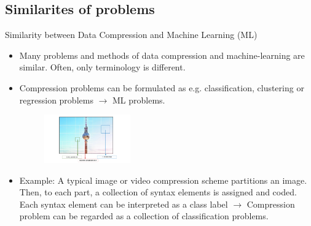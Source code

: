 \subsection{Similarites of problems}
\begin{frame}{Similarity between Data Compression and Machine Learning (ML)}
\begin{itemize}
\item Many problems and methods of data compression and machine-learning are similar. Often, only terminology is different.
\item Compression problems can be formulated as e.g. classification, clustering or regression problems $\rightarrow$ ML problems.
\begin{figure}
\centering
\includegraphics[width=0.35\textwidth]{comprclass.png}
\end{figure}
\item Example: A typical image or video compression scheme partitions an image. 
Then, to each part, a collection of syntax elements is assigned and coded. Each syntax 
element can be interpreted as a class label $\mathbf{\rightarrow}$ Compression problem can be regarded as a collection of classification problems. 
\end{itemize}
\end{frame}


